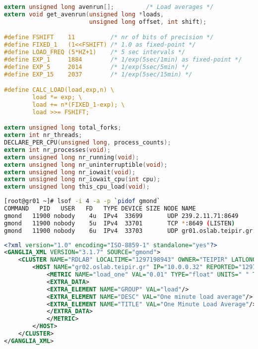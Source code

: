 \begin{lstlisting}[language=C,caption=Linux kernel CALC\_LOAD macro,label=kernel]
extern unsigned long avenrun[];         /* Load averages */
extern void get_avenrun(unsigned long *loads, 
                        unsigned long offset, int shift);

#define FSHIFT    11          /* nr of bits of precision */
#define FIXED_1   (1<<FSHIFT) /* 1.0 as fixed-point */
#define LOAD_FREQ (5*HZ+1)    /* 5 sec intervals */
#define EXP_1     1884        /* 1/exp(5sec/1min) as fixed-point */
#define EXP_5     2014        /* 1/exp(5sec/5min) */
#define EXP_15    2037        /* 1/exp(5sec/15min) */

#define CALC_LOAD(load,exp,n) \
        load *= exp; \
        load += n*(FIXED_1-exp); \
        load >>= FSHIFT;

extern unsigned long total_forks;
extern int nr_threads;
DECLARE_PER_CPU(unsigned long, process_counts);
extern int nr_processes(void);
extern unsigned long nr_running(void);
extern unsigned long nr_uninterruptible(void);
extern unsigned long nr_iowait(void);
extern unsigned long nr_iowait_cpu(int cpu);
extern unsigned long this_cpu_load(void);
\end{lstlisting}

\begin{lstlisting}[language=bash,caption=Gmond networking,label=lsof]
[root@gr01 ~]# lsof -i 4 -a -p `pidof gmond`
COMMAND   PID   USER   FD   TYPE DEVICE SIZE NODE NAME
gmond   11900 nobody    4u  IPv4  33699       UDP 239.2.11.71:8649 
gmond   11900 nobody    5u  IPv4  33701       TCP *:8649 (LISTEN)
gmond   11900 nobody    6u  IPv4  33703       UDP gr01.oslab.teipir.gr:39991->239.2.11.71:8649 
\end{lstlisting}

\begin{lstlisting}[language=XML,caption=Gmond XML cluster report,label=telnet_gmond]
<?xml version="1.0" encoding="ISO-8859-1" standalone="yes"?>
<GANGLIA_XML VERSION="3.1.7" SOURCE="gmond">
	<CLUSTER NAME="RDLAB" LOCALTIME="1297198943" OWNER="TEIPIR" LATLONG="unspecified" URL="unspecified">
		<HOST NAME="gr02.oslab.teipir.gr" IP="10.0.0.32" REPORTED="1297198934" TN="8" TMAX="20" DMAX="0" LOCATION="unspecified" GMOND_STARTED="1296569542">
			<METRIC NAME="load_one" VAL="0.01" TYPE="float" UNITS=" " TN="50" TMAX="70" DMAX="0" SLOPE="both">
			<EXTRA_DATA>
			<EXTRA_ELEMENT NAME="GROUP" VAL="load"/>
			<EXTRA_ELEMENT NAME="DESC" VAL="One minute load average"/>
			<EXTRA_ELEMENT NAME="TITLE" VAL="One Minute Load Average"/>
			</EXTRA_DATA>
			</METRIC>
		</HOST>
	</CLUSTER>
</GANGLIA_XML>
\end{lstlisting}

